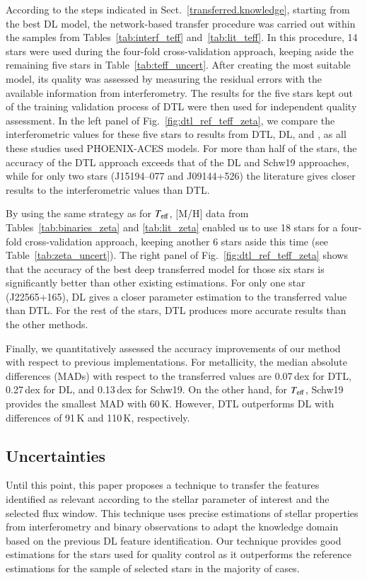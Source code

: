 \documentclass{aa}
\begin{document}
According to the steps indicated in Sect.~\ref{transferred.knowledge}, starting from the best DL model, the network-based transfer procedure was carried out within the samples from Tables~\ref{tab:interf_teff} {and~\ref{tab:lit_teff}.} In this procedure, 14 stars were used during the four-fold cross-validation approach, keeping aside the remaining five stars in {Table~\ref{tab:teff_uncert}}.
After creating the most suitable model, its quality was assessed by measuring the residual errors with the available information from interferometry.
The results for the five stars kept out {of} the training validation process of DTL were then used for independent quality assessment.
In the left panel of Fig.~\ref{fig:dtl_ref_teff_zeta}, we compare the interferometric values for these five stars to results from DTL, DL, and \citet[][Schw19]{Schweitzer2019}, as all these {studies} used PHOENIX-ACES models. 
For more than half of the stars, the accuracy of the DTL approach exceeds that of the DL and Schw19 approaches, while for only two stars (J15194--077 and J09144+526) the literature gives closer results to the interferometric values than DTL.

By using the same strategy as for $T_{\rm eff}$, [M/H] data from {Tables~\ref{tab:binaries_zeta} and} \ref{tab:lit_zeta} enabled us to use 18 stars for a four-fold cross-validation approach, keeping another 6 stars aside this time {(see Table~\ref{tab:zeta_uncert})}. 
The right panel of Fig.~\ref{fig:dtl_ref_teff_zeta} shows that the accuracy of the best deep transferred model for those six stars is significantly better than other existing estimations. For only one star (J22565+165), DL gives a closer parameter estimation to the transferred value than DTL. For the rest of the stars, DTL produces more accurate results than the other methods. 

Finally, we quantitatively assessed the accuracy improvements of our method with respect to previous implementations.
For metallicity, the median absolute differences (MADs) with respect to the transferred values are 0.07\,dex for DTL, 0.27\,dex for DL, and 0.13\,dex for Schw19. On the other hand, for $T_{\rm eff}$, Schw19 provides the smallest MAD with 60\,K. However, DTL outperforms DL with differences of 91\,K and 110\,K, respectively.


\subsection{Uncertainties}

Until this point, this paper proposes a technique to transfer the features identified as relevant according to the stellar parameter of interest and the selected flux window. This technique uses precise estimations of stellar properties from interferometry and binary observations to adapt the knowledge domain based on the previous DL feature identification.
{Our} technique {provides} good estimations for the stars used for quality control as it outperforms the reference estimations for the sample of selected stars in the majority of cases. 
\end{document}
